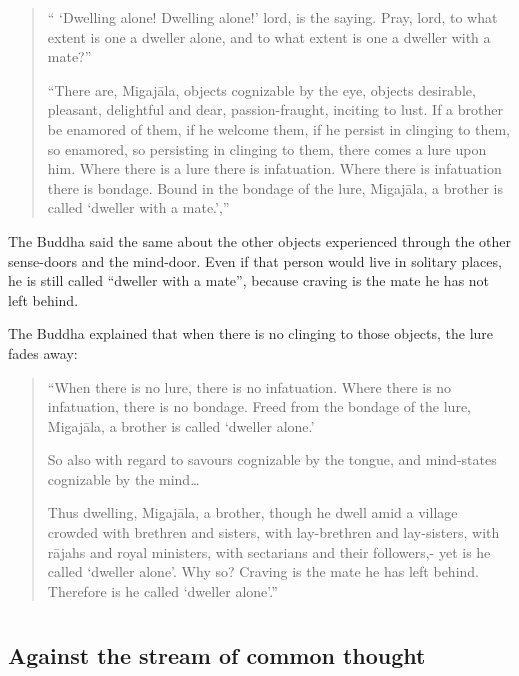 \begin{quote}

`` `Dwelling alone! Dwelling alone!' lord, is the saying. Pray, lord, to
what extent is one a dweller alone, and to what extent is one a dweller
with a mate?''

``There are, Migajāla, objects cognizable by the eye, objects
desirable, pleasant, delightful and dear, passion-fraught, inciting to
lust. If a brother be enamored of them, if he welcome them, if he
persist in clinging to them, so enamored, so persisting in clinging to
them, there comes a lure upon him. Where there is a lure there is
infatuation. Where there is infatuation there is bondage. Bound in the
bondage of the lure, Migajāla, a brother is called `dweller with a
mate.',''
\end{quote}

The Buddha said the same about the other objects experienced through the
other sense-doors and the mind-door. Even if that person would live in
solitary places, he is still called ``dweller with a mate'', because
craving is the mate he has not left behind.

The Buddha explained that when there is no clinging to those objects,
the lure fades away:

\begin{quote}
``When there is no lure, there is no infatuation. Where there is no
infatuation, there is no bondage. Freed from the bondage of the lure,
Migajāla, a brother is called `dweller alone.'

So also with regard to savours cognizable by the tongue, and mind-states
cognizable by the mind\ldots{}

Thus dwelling, Migajāla, a brother, though he dwell amid a village
crowded with brethren and sisters, with lay-brethren and lay-sisters,
with rājahs and royal ministers, with sectarians and their followers,-
yet is he called `dweller alone'. Why so? Craving is the mate he has
left behind. Therefore is he called `dweller alone'.''
\end{quote}



\chapter[Against the stream]{}
\section*{Against the stream of common thought}

